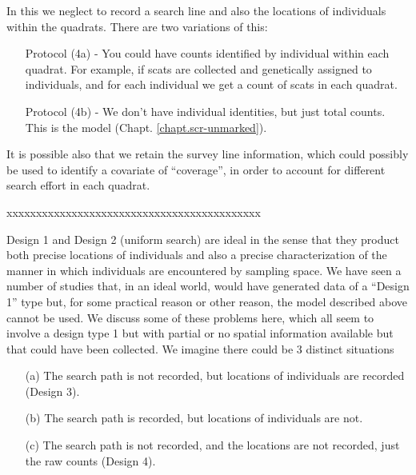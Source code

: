In this we neglect to record a search line and also the locations of individuals
within the quadrats.  There are two variations of this:
\begin{itemize}
\item[] Protocol (4a) - You could have
counts
identified by individual within each quadrat.
For example, if scats are collected and genetically assigned to individuals, and for each individual we get a count of scats in each quadrat.
\item[] Protocol (4b) - We don't have
individual identities, but just total counts. This is the
\citet{chandler_royle:2012} model (Chapt. \ref{chapt.scr-unmarked}).
\end{itemize}
It is possible also that we retain the survey line information, which
could possibly be used to identify a covariate of ``coverage'', in
order to account for different search effort in each quadrat.


xxxxxxxxxxxxxxxxxxxxxxxxxxxxxxxxxxxxxxxxxxx









Design 1 and Design 2 (uniform search) are ideal in the sense that they product
both precise locations of individuals and also a precise
characterization of the manner in which individuals are encountered
by sampling space.
We have seen a number of studies that, in an ideal world, would have
generated data of a ``Design 1'' type but, for some practical reason
or other reason, the model described above cannot be used.
We discuss some of these problems here, which all seem to involve a
design type 1 but with partial or no spatial information available but
that could
have been collected. We imagine there could be
3 distinct situations
\begin{itemize}
\item[(a)] The search path is not recorded, but locations  of
  individuals are recorded (Design 3).
\item[(b)] The search path is recorded, but locations of individuals
  are not.
\item[(c)] The search path is not recorded, and the locations are not
  recorded, just the raw counts (Design 4).
\end{itemize}

